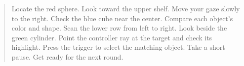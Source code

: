 \begin{quote}
Locate the red sphere. Look toward the upper shelf. Move your gaze slowly to the right. Check the blue cube near the center. Compare each object's color and shape. Scan the lower row from left to right. Look beside the green cylinder. Point the controller ray at the target and check its highlight. Press the trigger to select the matching object. Take a short pause. Get ready for the next round.
\end{quote}

